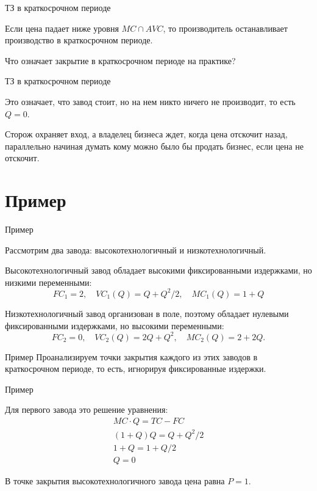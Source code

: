 \documentclass{beamer}
\begin{document}
\begin{frame}{ТЗ в краткосрочном периоде}

\begin{lemma}
Если цена падает ниже уровня $MC \cap AVC$, то производитель останавливает производство в краткосрочном периоде.
\end{lemma}

Что означает закрытие в краткосрочном периоде на практике?

\end{frame}

\begin{frame}{ТЗ в краткосрочном периоде}

Это означает, что завод стоит, но на нем никто ничего не производит, то есть $Q=0$. 

Сторож охраняет вход, а владелец бизнеса ждет, когда цена отскочит назад, параллельно начиная думать кому можно было бы продать бизнес, если цена не отскочит.

\end{frame}

\section{Пример}

\begin{frame}{Пример}

Рассмотрим два завода: высокотехнологичный и низкотехнологичный. 

Высокотехнологичный завод обладает высокими фиксированными издержками, но низкими переменными:
$$FC_1 = 2, \quad VC_1(Q) = Q + Q^2/2, \quad MC_1(Q) = 1 + Q$$

Низкотехнологичный завод организован в поле, поэтому обладает нулевыми фиксированными издержками, но высокими переменными:
$$FC_2 = 0, \quad VC_2(Q) = 2Q + Q^2, \quad MC_2(Q) = 2 + 2Q.$$
\end{frame}

\begin{frame}{Пример}
Проанализируем точки закрытия каждого из этих заводов \alert{в краткосрочном периоде}, то есть, игнорируя фиксированные издержки.
\end{frame}

\begin{frame}{Пример}
	
Для первого завода это решение уравнения:
\begin{gather*}
MC \cdot Q = TC - FC\\
(1+Q) Q = Q + Q^2/2 \\
1+Q = 1+Q/2\\
Q = 0
\end{gather*}

В точке закрытия высокотехнологичного завода цена равна $P=1$. 
	
\end{frame}
\end{document}
